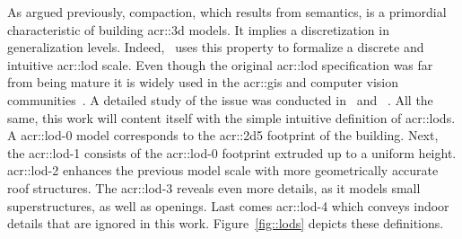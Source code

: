             \begin{figure}
                \begin{center}
                \end{center}
            \end{figure}
            
            As argued previously, compaction, which results from semantics, is a primordial characteristic of building \gls{acr::3d} models.
            It implies a discretization in generalization levels.
            Indeed,~\textcite{groger2012citygml} uses this property to formalize a discrete and intuitive \gls{acr::lod} scale.
            Even though the original \gls{acr::lod} specification was far from being mature it is widely used in the \gls{acr::gis} and computer vision communities~\parencite{biljecki2014formalisation, rau2006lod}.
            A detailed study of the issue was conducted in~\textcite{biljecki2014formalisation} and ~\textcite{biljecki2016improved}.
            All the same, this work will content itself with the simple intuitive definition of \glspl{acr::lod}.\\
            A \gls*{acr::lod}-0 model corresponds to the \gls{acr::2d5} footprint of the building.
            Next, the \gls*{acr::lod}-1 consists of the \gls*{acr::lod}-0 footprint extruded up to a uniform height.
            \gls*{acr::lod}-2 enhances the previous model scale with more geometrically accurate roof structures.
            The \gls*{acr::lod}-3 reveals even more details, as it models small superstructures, as well as openings.
            Last comes \gls*{acr::lod}-4 which conveys indoor details that are ignored in this work.
            Figure~\ref{fig::lods} depicts these definitions.\\

